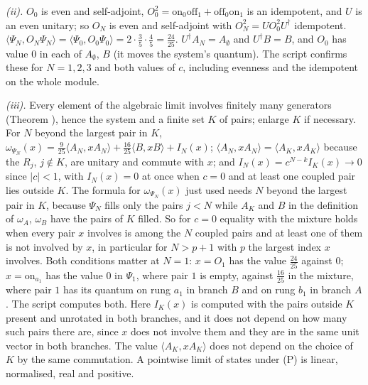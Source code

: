 \emph{(ii).} $O_{0}$ is even and self-adjoint, $O_{0}^{2} = \mathrm{on}_{0}\mathrm{off}_{1} + \mathrm{off}_{0}\mathrm{on}_{1}$ is an idempotent, and $U$ is an even unitary; so $O_{N}$ is even and self-adjoint with $O_{N}^{2} = UO_{0}^{2}U^{\dagger}$ idempotent. $\langle\Psi_{N}, O_{N}\Psi_{N}\rangle = \langle\Psi_{0}, O_{0}\Psi_{0}\rangle = 2\cdot\tfrac35\cdot\tfrac45 = \tfrac{24}{25}$. $U^{\dagger}A_{N} = A_{\emptyset}$ and $U^{\dagger}B = B$, and $O_{0}$ has value $0$ in each of $A_{\emptyset}$, $B$ (it moves the system's quantum). The script confirms these for $N = 1, 2, 3$ and both values of $c$, including evenness and the idempotent on the whole module.

\emph{(iii).} Every element of the algebraic limit involves finitely many generators (Theorem ), hence the system and a finite set $K$ of pairs; enlarge $K$ if necessary. For $N$ beyond the largest pair in $K$, $\omega_{\Psi_{N}}(x) = \tfrac{9}{25}\langle A_{N}, xA_{N}\rangle + \tfrac{16}{25}\langle B, xB\rangle + I_{N}(x)$; $\langle A_{N}, xA_{N}\rangle = \langle A_{K}, xA_{K}\rangle$ because the $R_{j}$, $j \notin K$, are unitary and commute with $x$; and $I_{N}(x) = c^{N-k}I_{K}(x) \to 0$ since $|c| < 1$, with $I_{N}(x) = 0$ at once when $c = 0$ and at least one coupled pair lies outside $K$. The formula for $\omega_{\Psi_{N}}(x)$ just used needs $N$ beyond the largest pair in $K$, because $\Psi_{N}$ fills only the pairs $j < N$ while $A_{K}$ and $B$ in the definition of $\omega_{A}$, $\omega_{B}$ have the pairs of $K$ filled. So for $c = 0$ equality with the mixture holds when every pair $x$ involves is among the $N$ coupled pairs and at least one of them is not involved by $x$, in particular for $N > p + 1$ with $p$ the largest index $x$ involves. Both conditions matter at $N = 1$: $x = O_{1}$ has the value $\tfrac{24}{25}$ against $0$; $x = \mathrm{on}_{a_{1}}$ has the value $0$ in $\Psi_{1}$, where pair $1$ is empty, against $\tfrac{16}{25}$ in the mixture, where pair $1$ has its quantum on rung $a_{1}$ in branch $B$ and on rung $b_{1}$ in branch $A$. The script computes both. Here $I_{K}(x)$ is computed with the pairs outside $K$ present and unrotated in both branches, and it does not depend on how many such pairs there are, since $x$ does not involve them and they are in the same unit vector in both branches. The value $\langle A_{K}, xA_{K}\rangle$ does not depend on the choice of $K$ by the same commutation. A pointwise limit of states under (P) is linear, normalised, real and positive.


